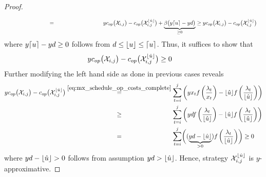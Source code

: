 \begin{proof}
\begin{align*}
	&\stackrel{\phantom{\eqref{eq:mx_schedule_op_costs_complete}}}{=}&&y\opcosts\bigl(\mx_{i,j}\bigr)-\opcosts\bigl(\mx_{i,j}^{\floor{\hat{u}}}\bigr)+\underbrace{\beta\bigl(y\ceil{u}-yd\bigr)}_{\ge 0}\ge y\opcosts\bigl(\mx_{i,j}\bigr)-\opcosts\bigl(\mx_{i,j}^{\floor{\hat{u}}}\bigr)
\end{align*}
where $y\lceil u\rceil-yd\ge 0$ follows from $d\le \lfloor u\rfloor\le \lceil u\rceil$. Thus, it suffices to show that
\begin{align}
	yc_{op}\bigl(\mathcal{X}_{i,j}\bigr)-c_{op}\bigl(\mathcal{X}_{i,j}^{\lfloor\hat{u}\rfloor}\bigr)&\ge 0\label{eq:op_cost_floor_u_hat_y_approx}
\end{align}
Further modifying the left hand side as done in previous cases reveals
\begin{align*}
	y\opcosts\bigl(\mx_{i,j}\bigr)-\opcosts\bigl(\mx_{i,j}^{\floor{\hat{u}}}\bigr)&\stackrel{\eqref{eq:mx_schedule_op_costs_complete}}{=}\sum\limits_{t=i}^{j}\left(yx_tf\left(\frac{\lambda_t}{x_t}\right)-\floor{\hat{u}}f\left(\frac{\lambda_t}{\floor{\hat{u}}}\right)\right)\\
	&\stackrel{\phantom{\eqref{eq:mx_schedule_op_costs_complete}}}{\ge}\sum\limits_{t=i}^{j}\left(ydf\left(\frac{\lambda_t}{\floor{\hat{u}}}\right)-\floor{\hat{u}}f\left(\frac{\lambda_t}{\floor{\hat{u}}}\right)\right)\\
	&\stackrel{\phantom{\eqref{eq:mx_schedule_op_costs_complete}}}{=}\sum\limits_{t=i}^{j}\biggl((\underbrace{yd-\floor{\hat{u}}}_{>0})f\left(\frac{\lambda_t}{\floor{\hat{u}}}\right)\biggr)\ge 0
\end{align*}
where $yd-\lfloor\hat{u}\rfloor>0$ follows from assumption $yd>\lfloor\hat{u}\rfloor$. Hence, strategy $\mathcal{X}_{i,j}^{\lfloor\hat{u}\rfloor}$ is $y$-approxi\-mative.


\end{proof}
